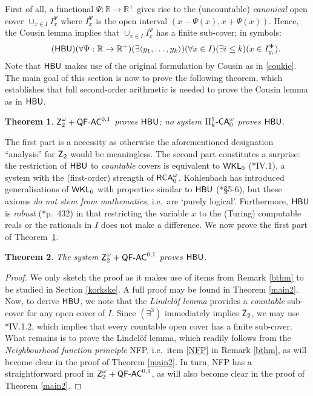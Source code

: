 \documentclass[reqno]{amsart}
\newcommand{\Z}{{\textsf{\textup{Z}}}}
\newtheorem{thm}{Theorem}
\newcommand\be{\begin{equation}}
\newcommand\ee{\end{equation}}
\def\SIXK{\Pi_{k}^{1}\text{-\textsf{\textup{CA}}}_{0}^{\omega}}
\def\RCAo{\textup{\textsf{RCA}}_{0}^{\omega}}
\def\WKL{\textup{\textsf{WKL}}}
\def\R{{\mathbb  R}}
\def\di{\rightarrow}
\def\QFAC{\textup{\textsf{QF-AC}}}
\def\HBU{\textup{\textsf{HBU}}}
\numberwithin{equation}{section}
\numberwithin{thm}{section}
\begin{document}
First of all, a functional $\Psi:\R\di \R^{+}$ gives rise to the (uncountable) \emph{canonical} open cover $\cup_{x\in I} I_{x}^{\Psi}$ where $I_{x}^{\Psi}$ is the open interval $(x-\Psi(x), x+\Psi(x))$.  
Hence, the Cousin lemma implies that $\cup_{x\in I} I_{x}^{\Psi}$ has a finite sub-cover; in symbols:
\be\tag{$\HBU$}
(\forall \Psi:\R\di \R^{+})(\exists \langle y_{1}, \dots, y_{k}\rangle)(\forall x\in I)(\exists i\leq k)(x\in I_{y_{i}}^{\Psi}).
\ee
Note that $\HBU$ makes use of the original formulation by Cousin as in \eqref{coukie}.
The main goal of this section is now to prove the following theorem, which establishes that full 
second-order arithmetic is needed to prove the Cousin lemma as in $\HBU$. 
\begin{thm}\label{main1}
 $\Z_{2}^{\omega}+\QFAC^{0,1}$ proves $\HBU$; no system $\SIXK$ proves $\HBU$.
\end{thm}
The first part is a necessity as otherwise the aforementioned designation ``analysis'' for $\Z_{2}$ would be meaningless.  
The second part constitutes a surprise: the restriction of $\HBU$ to \emph{countable} covers is equivalent to $\WKL_{0}$ (\cite{simpson2}*{IV.1}), a system with the (first-order) strength of $\RCAo$. Kohlenbach has introduced generalisations of $\WKL_{0}$ with properties similar to $\HBU$ (\cite{kohlenbach4}*{\S5-6}), but these axioms \emph{do not stem from mathematics}, i.e.\ are `purely logical'.  Furthermore, $\HBU$ is \emph{robust} (\cite{montahue}*{p.\ 432}) in that restricting the variable $x$ to the (Turing) computable reals or the rationals in $I$ does not make a difference.       
We now prove the first part of Theorem~\ref{main1}.
\begin{thm}\label{main1a}
The system $\Z_{2}^{\omega}+\QFAC^{0,1}$ proves $\HBU$.
\end{thm}
\begin{proof}
We only sketch the proof as it makes use of items from Remark \ref{bthm} to be studied in Section \ref{korkske}.
A full proof may be found in Theorem \ref{main2}.
Now, to derive $\HBU$, we note that the \emph{Lindel\"of lemma} provides a \emph{countable} sub-cover for any open cover of $I$.  Since $(\exists^{3})$ immediately implies $\Z_{2}$, we may use \cite{simpson2}*{IV.1.2}, which 
implies that every countable open cover has a finite sub-cover.  What remains is to prove the Lindel\"of lemma, which readily follows from the \emph{Neighbourhood function principle} \textsf{NFP}, i.e.\ item \eqref{NFP} in Remark \ref{bthm}, as will become clear in the proof of Theorem \ref{main2}.  
In turn, \textsf{NFP} has a straightforward proof in $\Z_{2}^{\omega}+\QFAC^{0,1}$, as will also become clear in the proof of Theorem \ref{main2}.  
\end{proof}
\end{document}
